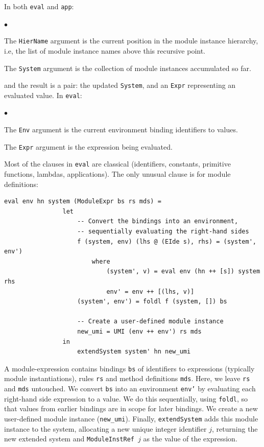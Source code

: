 \documentclass[11pt]{article}
\newenvironment{tightlist}%
{\begin{list}{$\bullet$}{%
    \setlength{\topsep}{0in}
    \setlength{\partopsep}{0in}
    \setlength{\itemsep}{0in}
    \setlength{\parsep}{0in}
    \setlength{\leftmargin}{1.5em}
    \setlength{\rightmargin}{0in}
    \setlength{\itemindent}{0in}
}
}%
{\end{list}
}
\newcommand{\term}[1]{\texttt{#1}}
\begin{document}
In both \term{eval} and \term{app}:
\begin{tightlist}

\item The \term{HierName} argument is the current position in the module instance
hierarchy, i.e, the list of module instance names above this recursive point.

\item The \term{System} argument is the collection of module instances accumulated so far.

\end{tightlist}

and the result is a pair: the updated \term{System}, and an
\term{Expr} representing an evaluated value.  In \term{eval}:
\begin{tightlist}

\item The \term{Env} argument is the current environment binding identifiers to values.

\item The \term{Expr} argument is the expression being evaluated.

\end{tightlist}

Most of the clauses in \term{eval} are classical (identifiers,
constants, primitive functions, lambdas, applications).  The only
unusual clause is for module definitions:

\begin{Verbatim}[frame=single, commandchars=\\\{\}]
eval env hn system (ModuleExpr bs rs mds) =
                let
                    -- Convert the bindings into an environment,
                    -- sequentially evaluating the right-hand sides
                    f (system, env) (lhs @ (EIde s), rhs) = (system', env')
                        where
                            (system', v) = eval env (hn ++ [s]) system rhs
                            env' = env ++ [(lhs, v)]
                    (system', env') = foldl f (system, []) bs

                    -- Create a user-defined module instance
                    new_umi = UMI (env ++ env') rs mds
                in
                    extendSystem system' hn new_umi
\end{Verbatim}

A module-expression contains bindings \term{bs} of identifiers to
expressions (typically module instantiations), rules \term{rs} and
method definitions \term{mds}.  Here, we leave \term{rs} and
\term{mds} untouched.  We convert \term{bs} into an environment
\term{env'} by evaluating each right-hand side expression to a value.
We do this sequentially, using \term{foldl}, so that values from
earlier bindings are in scope for later bindings.  We create a new
user-defined module instance (\term{new\_umi}).  Finally,
\term{extendSystem} adds this module instance to the system,
allocating a new unique integer identifier $j$, returning the new
extended system and \term{ModuleInstRef~$j$} as the value of the
expression.
\end{document}
